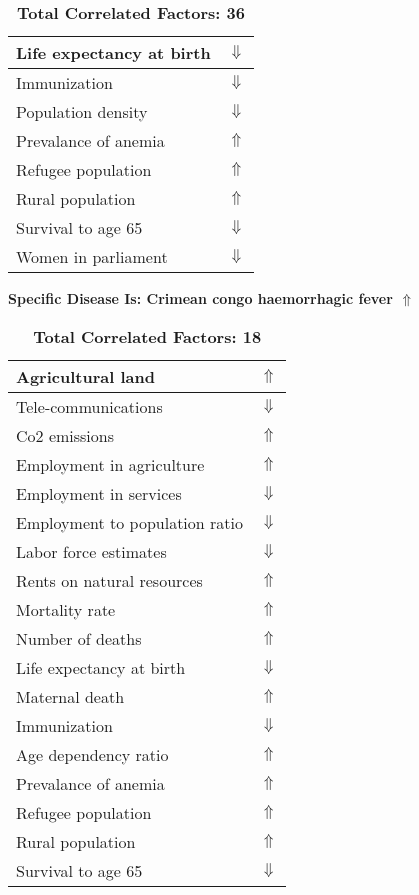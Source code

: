 \documentclass[12pt,notitlepage,oneside]{report}
\begin{document}
\begin{table}[!htb]
\begin{tabular}{|l|l|}
Life expectancy at birth & $\Downarrow$\\ \hline
Immunization & $\Downarrow$\\ \hline
Population density & $\Downarrow$\\ \hline
Prevalance of anemia & $\Uparrow$\\ \hline
Refugee population & $\Uparrow$\\ \hline
Rural population & $\Uparrow$\\ \hline
Survival to age 65 & $\Downarrow$\\ \hline
Women in parliament & $\Downarrow$\\ \hline
\end{tabular}
\caption*{\textbf{Total Correlated Factors: 36}}
\end{table}
\clearpage
\begin{table}[!htb]
\caption{\textbf{Specific Disease Is: Crimean congo haemorrhagic fever $\Uparrow$}}
\centering
\label{Correlated Socio-economic Factors0}
\begin{tabular}{|l|l|}
\hline
Agricultural land & $\Uparrow$\\ \hline
Tele-communications & $\Downarrow$\\ \hline
Co2 emissions & $\Uparrow$\\ \hline
Employment in agriculture & $\Uparrow$\\ \hline
Employment in services & $\Downarrow$\\ \hline
Employment to population ratio & $\Downarrow$\\ \hline
Labor force estimates & $\Downarrow$\\ \hline
Rents on natural resources & $\Uparrow$\\ \hline
Mortality rate & $\Uparrow$\\ \hline
Number of deaths & $\Uparrow$\\ \hline
Life expectancy at birth & $\Downarrow$\\ \hline
Maternal death & $\Uparrow$\\ \hline
Immunization & $\Downarrow$\\ \hline
Age dependency ratio & $\Uparrow$\\ \hline
Prevalance of anemia & $\Uparrow$\\ \hline
Refugee population & $\Uparrow$\\ \hline
Rural population & $\Uparrow$\\ \hline
Survival to age 65 & $\Downarrow$\\ \hline
\end{tabular}
\caption*{\textbf{Total Correlated Factors: 18}}
\end{table}
\end{document}
